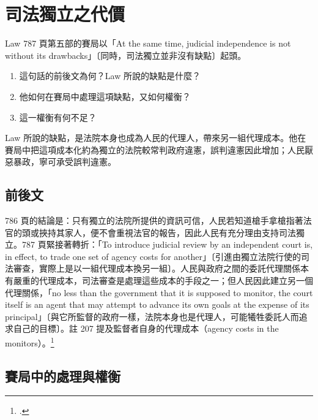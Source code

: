 \chapter{司法獨立之代價}
\label{ch:70_independence}

\begin{qaquestion}
Law 787 頁第五部的賽局以「At the same time, judicial independence is not without its drawbacks」〔同時，司法獨立並非沒有缺點〕起頭。
\begin{enumerate}
\tightlist
\item 這句話的前後文為何？Law 所說的缺點是什麼？
\item 他如何在賽局中處理這項缺點，又如何權衡？
\item 這一權衡有何不足？
\end{enumerate}
\end{qaquestion}

Law 所說的缺點，是法院本身也成為人民的代理人，帶來另一組代理成本。他在賽局中把這項成本化約為獨立的法院較常判政府違憲，誤判違憲因此增加；人民厭惡暴政，寧可承受誤判違憲。

\section{前後文}
\label{sec:70_independence-1}

786 頁的結論是：只有獨立的法院所提供的資訊可信，人民若知道槍手拿槍指著法官的頭或挾持其家人，便不會重視法官的報告，因此人民有充分理由支持司法獨立。787 頁緊接著轉折：「To introduce judicial review by an independent court is, in effect, to trade one set of agency costs for another」〔引進由獨立法院行使的司法審查，實際上是以一組代理成本換另一組〕。人民與政府之間的委託代理關係本有嚴重的代理成本，司法審查是處理這些成本的手段之一；但人民因此建立另一個代理關係，「no less than the government that it is supposed to monitor, the court itself is an agent that may attempt to advance its own goals at the expense of its principal」〔與它所監督的政府一樣，法院本身也是代理人，可能犧牲委託人而追求自己的目標〕。註 207 提及監督者自身的代理成本（agency costs in the monitors）。\footcite[786--787 \& n.207]{law2009}

\section{賽局中的處理與權衡}
\label{sec:70_independence-2}

